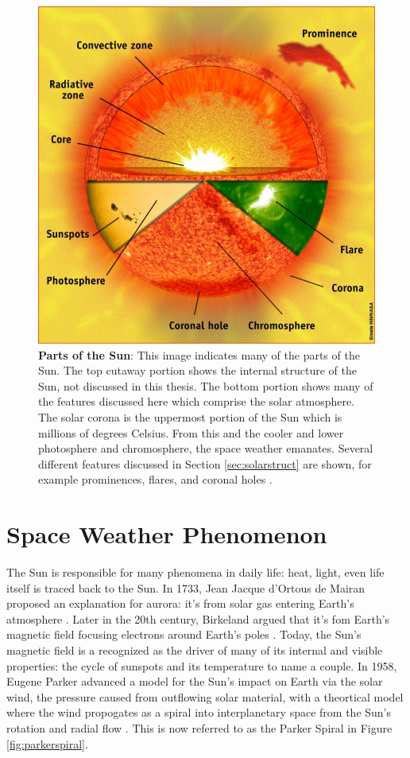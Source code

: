 \documentclass[twoside]{report}
\begin{document}
\begin{figure}[ht]
  \begin{center}
    \includegraphics[scale=0.4]{sunparts}
    \caption{{\bf Parts of the Sun}: This image indicates many of the parts of the Sun. The top cutaway portion shows the internal structure of the Sun, not discussed in this thesis. The bottom portion shows many of the features discussed here which comprise the solar atmosphere. The solar corona is the uppermost portion of the Sun which is millions of degrees Celsius. From this and the cooler and lower photosphere and chromosphere, the space weather emanates. Several different features discussed in Section \ref{sec:solarstruct} are shown, for example prominences, flares, and coronal holes \cite{sunparts}.}
    \label{fig:sunparts}
 \end{center}
\end{figure}


\section{Space Weather Phenomenon} \label{sec:space-weather-events}
The Sun is responsible for many phenomena in daily life: heat, light, even life itself is traced back to the Sun. In 1733, Jean Jacque d'Ortous de Mairan proposed an explanation for aurora: it's from solar gas entering Earth's atmosphere \cite[p. 51]{langbook}. Later in the 20th century, Birkeland argued that it's fom Earth's magnetic field focusing electrons around Earth's poles \cite[p. 51]{langbook}. Today, the Sun's magnetic field is a recognized as the driver of many of its internal and visible properties: the cycle of sunspots and its temperature to name a couple. In 1958, Eugene Parker advanced a model for the Sun's impact on Earth via the solar wind, the pressure caused from outflowing solar material, with a theortical model where the wind propogates as a spiral into interplanetary space from the Sun's rotation and radial flow \cite[p. 62]{langbook}. This is now referred to as the Parker Spiral in Figure \ref{fig:parkerspiral}. 
\end{document}
